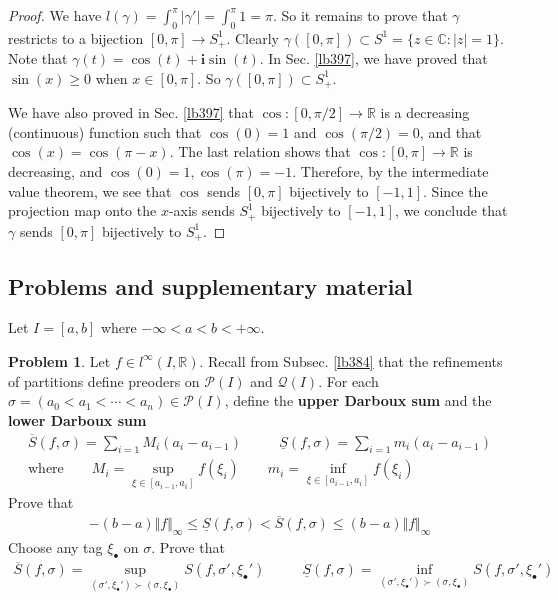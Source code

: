 \documentclass[12pt,b5paper,notitlepage]{article}
\theoremstyle{definition}
\newtheorem{prob}{\color{red}Problem}[section]
\theoremstyle{plain}
\newcommand{\mc}{\mathcal}
\newcommand{\ovl}{\overline}
\newcommand{\im}{\mathbf{i}}
\newcommand{\blt}{\bullet}
\newcommand{\Cbb}{\mathbb C}
\newcommand{\Rbb}{\mathbb R}
\numberwithin{equation}{section}
\begin{document}
\begin{proof}
We have $l(\gamma)=\int_0^\pi |\gamma'|=\int_0^\pi 1=\pi$. So it remains to prove that $\gamma$ restricts to a bijection $[0,\pi]\rightarrow S^1_+$. Clearly $\gamma([0,\pi])\subset S^1=\{z\in\Cbb:|z|=1\}$. Note that $\gamma(t)=\cos(t)+\im\sin(t)$. In Sec. \ref{lb397}, we have proved that $\sin(x)\geq0$ when $x\in[0,\pi]$. So $\gamma([0,\pi])\subset S^1_+$. 

We have also proved in Sec. \ref{lb397} that $\cos:[0,\pi/2]\rightarrow\Rbb$ is a decreasing (continuous) function such that $\cos(0)=1$ and $\cos(\pi/2)=0$, and that $\cos(x)=\cos(\pi-x)$. The last relation shows that $\cos:[0,\pi]\rightarrow\Rbb$ is decreasing, and $\cos(0)=1,\cos(\pi)=-1$. Therefore, by the intermediate value theorem, we see that $\cos$ sends $[0,\pi]$ bijectively to $[-1,1]$. Since the projection map onto the $x$-axis sends $S^1_+$ bijectively to $[-1,1]$, we conclude that $\gamma$ sends $[0,\pi]$ bijectively to $S^1_+$.
\end{proof}












\subsection{Problems and supplementary material}


Let $I=[a,b]$ where $-\infty<a<b<+\infty$.



\begin{prob}\label{lb386}
Let $f\in l^\infty(I,\Rbb)$. Recall from Subsec. \ref{lb384} that the refinements of partitions define preoders on $\mc P(I)$ and $\mc Q(I)$. For each $\sigma=(a_0<a_1<\cdots<a_n)\in\mc P(I)$, define the \textbf{upper Darboux sum} and the \textbf{lower Darboux sum} 
\begin{gather*}
\ovl S(f,\sigma)=\sum_{i=1}M_i(a_i-a_{i-1})\qquad~~~ \underline S(f,\sigma)=\sum_{i=1}m_i(a_i-a_{i-1})\\
\text{where}\qquad M_i=\sup_{\xi\in[a_{i-1},a_i]}f(\xi_i)\qquad m_i=\inf_{\xi\in[a_{i-1},a_i]}f(\xi_i)
\end{gather*}
Prove that 
\begin{align*}
-(b-a)\Vert f\Vert_\infty\leq\underline S(f,\sigma)<\ovl S(f,\sigma)\leq (b-a)\Vert f\Vert_\infty
\end{align*}
Choose any tag $\xi_\blt$ on $\sigma$. Prove that
\begin{gather}
\ovl S(f,\sigma)=\sup_{(\sigma',\xi_\blt')\succ (\sigma,\xi_\blt)} S(f,\sigma',\xi_\blt')\qquad~~~ \underline S(f,\sigma)=\inf_{(\sigma',\xi_\blt')\succ (\sigma,\xi_\blt)} S(f,\sigma',\xi_\blt')
\end{gather}
\end{prob}
\end{document}
